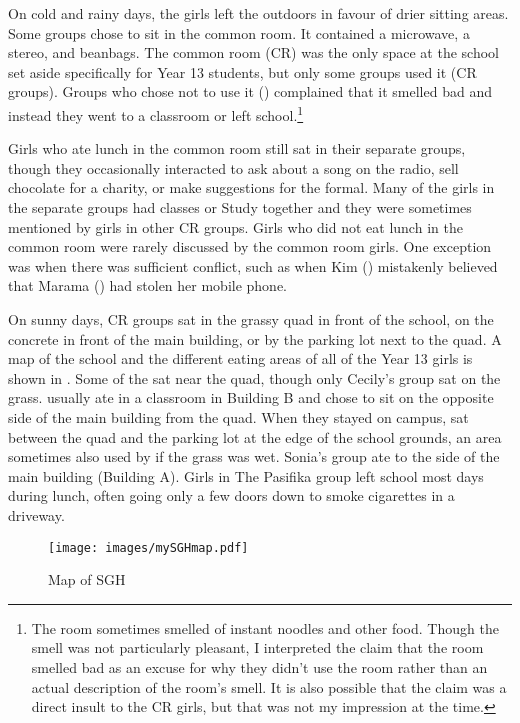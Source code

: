 On cold and rainy days, the girls left the outdoors in favour of drier sitting areas. Some groups chose to sit in the common room. It contained a microwave, a stereo, and beanbags. The common room (CR) was the only space at the school set aside specifically for Year 13 students, but only some groups used it (CR groups). Groups who chose not to use it () complained that it smelled bad and instead they went to a classroom or left school.\footnote{The room sometimes smelled of instant noodles and other food. Though the smell was not particularly pleasant, I interpreted the claim that the room smelled bad as an excuse for why they didn't use the room rather than an actual description of the room's smell. It is also possible that the claim was a direct insult to the CR girls, but that was not my impression at the time.} 

Girls who ate lunch in the common room still sat in their separate groups, though they occasionally interacted to ask about a song on the radio, sell chocolate for a charity, or make suggestions for the formal. Many of the girls in the separate groups had classes or Study together and they were sometimes mentioned by girls in other CR groups. Girls who did not eat lunch in the common room were rarely discussed by the common room girls. One exception was when there was sufficient conflict, such as when Kim () mistakenly believed that Marama () had stolen her mobile phone. 




On sunny days, CR groups sat in the grassy quad in front of the school, on the concrete in front of the main building, or by the parking lot next to the quad. A map of the school and the different eating areas of all of the Year 13 girls is shown in . Some of the  sat near the quad, though only Cecily's group sat on the grass.  usually ate in a classroom in Building B and  chose to sit on the opposite side of the main building from the quad. When they stayed on campus,  sat between the quad and the parking lot at the edge of the school grounds, an area sometimes also used by  if the grass was wet. Sonia's group ate to the side of the main building (Building A). Girls in The Pasifika group left school most days during lunch, often going only a few doors down to smoke cigarettes in a driveway. 

\begin{figure}[p]
	\centering
		\texttt{[image: images/mySGHmap.pdf]}
	\caption{Map of SGH}
	\label{fig:mySGHmap}
\end{figure}


